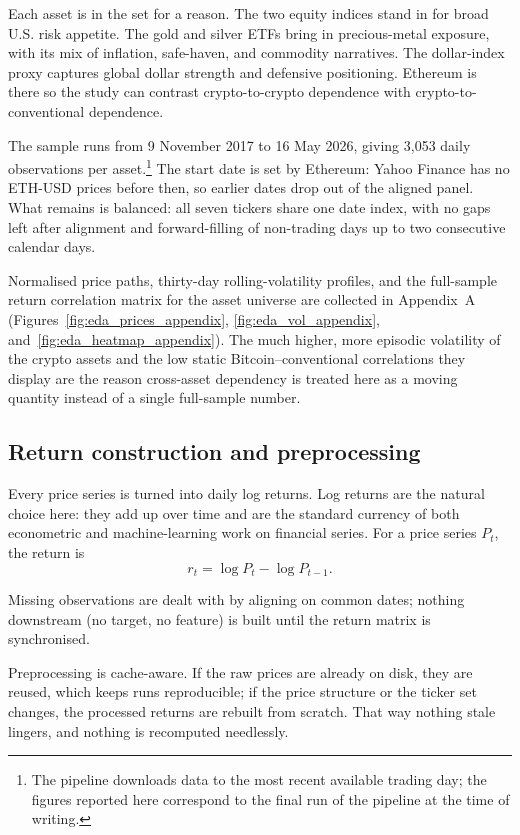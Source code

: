 Each asset is in the set for a reason. The two equity indices stand in for broad U.S. risk appetite. The gold and silver ETFs bring in precious-metal exposure, with its mix of inflation, safe-haven, and commodity narratives. The dollar-index proxy captures global dollar strength and defensive positioning. Ethereum is there so the study can contrast crypto-to-crypto dependence with crypto-to-conventional dependence.

The sample runs from 9 November 2017 to 16 May 2026, giving 3{,}053 daily observations per asset.\footnote{The pipeline downloads data to the most recent available trading day; the figures reported here correspond to the final run of the pipeline at the time of writing.} The start date is set by Ethereum: Yahoo Finance has no ETH-USD prices before then, so earlier dates drop out of the aligned panel. What remains is balanced: all seven tickers share one date index, with no gaps left after alignment and forward-filling of non-trading days up to two consecutive calendar days.

Normalised price paths, thirty-day rolling-volatility profiles, and the full-sample
return correlation matrix for the asset universe are collected in Appendix~A
(Figures~\ref{fig:eda_prices_appendix}, \ref{fig:eda_vol_appendix},
and~\ref{fig:eda_heatmap_appendix}). The much higher, more episodic volatility of the
crypto assets and the low static Bitcoin--conventional correlations they display are
the reason cross-asset dependency is treated here as a moving quantity instead of a
single full-sample number.

\subsection{Return construction and preprocessing}

Every price series is turned into daily log returns. Log returns are the natural choice here: they add up over time and are the standard currency of both econometric and machine-learning work on financial series. For a price series $P_t$, the return is
\[
    r_t = \log P_t - \log P_{t-1}.
\]

Missing observations are dealt with by aligning on common dates; nothing downstream (no target, no feature) is built until the return matrix is synchronised.

Preprocessing is cache-aware. If the raw prices are already on disk, they are reused, which keeps runs reproducible; if the price structure or the ticker set changes, the processed returns are rebuilt from scratch. That way nothing stale lingers, and nothing is recomputed needlessly.


